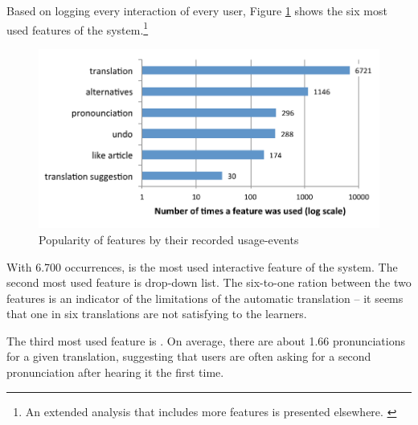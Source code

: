 Based on logging every interaction of every user, Figure \ref{fig:feature_usage} shows the six most used features of the system.\footnote{An extended analysis that includes more features is presented elsewhere. \cite{Chirtoaca17-apollo}}

  \begin{figure}[h!]
  \centering
    \includegraphics[width=0.9\columnwidth]{figures/reader_feature_usage}
    \caption{Popularity of features by their recorded usage-events}
    \label{fig:feature_usage}
  \end{figure}

With 6.700 occurrences,  is the most used interactive feature of the system. The second most used feature is  drop-down list. The six-to-one ration between the two features is an indicator of the limitations of the automatic translation -- it seems that one in six translations are not satisfying to the learners.

The third most used feature is . On average, there are about 1.66 pronunciations for a given translation, suggesting that users are often asking for a second pronunciation after hearing it the first time. 




